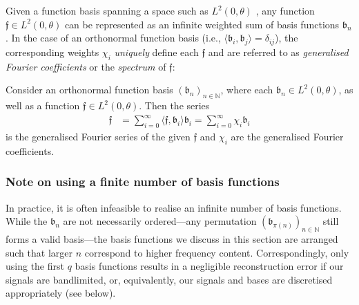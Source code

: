 Given a function basis spanning a space such as $L^2(0, \theta)$ \citep[e.g.,][]{young1988introduction}, any function $\mathfrak{f} \in L^2(0, \theta)$ can be represented as an infinite weighted sum of basis functions $\mathfrak{b}_n$.
In the case of an orthonormal function basis (i.e., $\langle \mathfrak{b}_i, \mathfrak{b}_j \rangle = \delta_{ij}$), the corresponding weights $\chi_i$ \emph{uniquely} define each $\mathfrak{f}$ and are referred to as \emph{generalised Fourier coefficients} or the \emph{spectrum} of $\mathfrak{f}$:

\begin{definition}
Consider an orthonormal function basis $(\mathfrak{b}_n)_{n \in \mathbb{N}}$, where each $\mathfrak{b}_n \in L^2(0, \theta)$, as well as a function $\mathfrak{f} \in L^2(0, \theta)$. 
Then the series
\begin{align}
	\mathfrak{f} &= \sum\nolimits_{i = 0}^\infty \langle \mathfrak{f}, \mathfrak{b}_i \rangle \mathfrak{b}_i = \sum\nolimits_{i = 0}^\infty \chi_i \mathfrak{b}_i
	\label{eqn:generalised_fourier_coefficients}
\end{align}
is the generalised Fourier series of the given $\mathfrak{f}$ and $\chi_i$ are the generalised Fourier coefficients.
\end{definition}

\subsubsection{Note on using a finite number of basis functions}
In practice, it is often infeasible to realise an infinite number of basis functions.
While the $\mathfrak{b}_n$ are not necessarily ordered---any permutation $(\mathfrak{b}_{\pi(n)})_{n \in \mathbb{N}}$ still forms a valid basis---the basis functions we discuss in this section are arranged such that larger $n$ correspond to higher frequency content.
Correspondingly, only using the first $q$ basis functions results in a negligible reconstruction error if our signals are bandlimited, or, equivalently, our signals and bases are discretised appropriately (see below).

